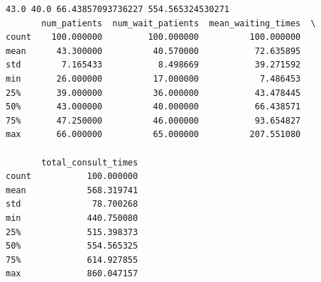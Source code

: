 \documentclass[pdflatex,ja=standard]{bxjsarticle}
\begin{document}
\begin{lstlisting}
43.0 40.0 66.43857093736227 554.565324530271
       num_patients  num_wait_patients  mean_waiting_times  \
count    100.000000         100.000000          100.000000   
mean      43.300000          40.570000           72.635895   
std        7.165433           8.498669           39.271592   
min       26.000000          17.000000            7.486453   
25%       39.000000          36.000000           43.478445   
50%       43.000000          40.000000           66.438571   
75%       47.250000          46.000000           93.654827   
max       66.000000          65.000000          207.551080   

       total_consult_times  
count           100.000000  
mean            568.319741  
std              78.700268  
min             440.750080  
25%             515.398373  
50%             554.565325  
75%             614.927855  
max             860.047157  
\end{lstlisting}
\end{document}
